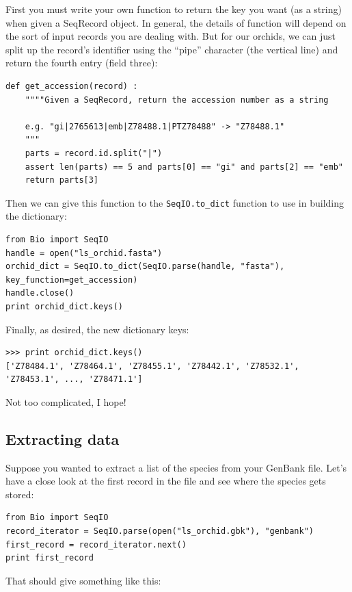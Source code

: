\documentclass{report}
\begin{document}
First you must write your own function to return the key you want (as a string) when given a SeqRecord object.  In general, the details of function will depend on the sort of input records you are dealing with.  But for our orchids, we can just split up the record's identifier using the ``pipe'' character (the vertical line) and return the fourth entry (field three):

\begin{verbatim}
def get_accession(record) :
    """"Given a SeqRecord, return the accession number as a string
    
    e.g. "gi|2765613|emb|Z78488.1|PTZ78488" -> "Z78488.1"
    """
    parts = record.id.split("|")
    assert len(parts) == 5 and parts[0] == "gi" and parts[2] == "emb"
    return parts[3]
\end{verbatim} 

\noindent Then we can give this function to the \verb|SeqIO.to_dict| function to use in building the dictionary:

\begin{verbatim}
from Bio import SeqIO
handle = open("ls_orchid.fasta")
orchid_dict = SeqIO.to_dict(SeqIO.parse(handle, "fasta"), key_function=get_accession)
handle.close()
print orchid_dict.keys()
\end{verbatim} 

\noindent Finally, as desired, the new dictionary keys:

\begin{verbatim}
>>> print orchid_dict.keys()
['Z78484.1', 'Z78464.1', 'Z78455.1', 'Z78442.1', 'Z78532.1', 'Z78453.1', ..., 'Z78471.1']
\end{verbatim}

\noindent Not too complicated, I hope!

\subsection{Extracting data}

Suppose you wanted to extract a list of the species from your GenBank file.  Let's have a close look at the first record in the file and see where the species gets stored:

\begin{verbatim}
from Bio import SeqIO
record_iterator = SeqIO.parse(open("ls_orchid.gbk"), "genbank")
first_record = record_iterator.next()
print first_record
\end{verbatim} 

\noindent That should give something like this:
\end{document}
